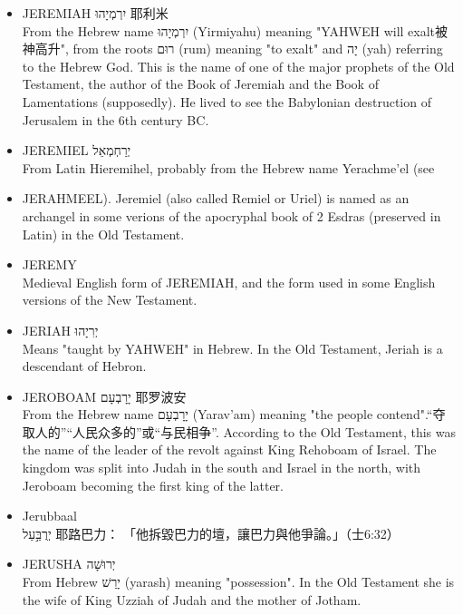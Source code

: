\begin{itemize}
From Hebrew יְרַחְמְאֵל (Yerachme'el) meaning "God will have pity". This name is borne by a few minor characters in the Old Testament.
\item JEREMIAH יִרְמְיָהוּ 耶利米\\
From the Hebrew name יִרְמְיָהוּ (Yirmiyahu) meaning "YAHWEH will exalt被神高升", from the roots רוּם (rum) meaning "to exalt" and יָה (yah) referring to the Hebrew God. This is the name of one of the major prophets of the Old Testament, the author of the Book of Jeremiah and the Book of Lamentations (supposedly). He lived to see the Babylonian destruction of Jerusalem in the 6th century BC.
\item JEREMIEL יְרַחְמְאֵל \\
From Latin Hieremihel, probably from the Hebrew name Yerachme'el (see \item JERAHMEEL). Jeremiel (also called Remiel or Uriel) is named as an archangel in some verions of the apocryphal book of 2 Esdras (preserved in Latin) in the Old Testament.
\item JEREMY \\
Medieval English form of JEREMIAH, and the form used in some English versions of the New Testament.
\item JERIAH יְרִיָהוּ \\
Means "taught by YAHWEH" in Hebrew. In the Old Testament, Jeriah is a descendant of Hebron.
\item JEROBOAM יָרָבְעָם 耶罗波安 \\
From the Hebrew name יָרָבְעָם (Yarav'am) meaning "the people contend".“夺取人的”“人民众多的”或“与民相争”. According to the Old Testament, this was the name of the leader of the revolt against King Rehoboam of Israel. The kingdom was split into Judah in the south and Israel in the north, with Jeroboam becoming the first king of the latter.
\item Jerubbaal יְרֻבַּ֣עַל 耶路巴力： 「他拆毀巴力的壇，讓巴力與他爭論。」（士6:32）
\item JERUSHA יְרוּשָׁה \\
From Hebrew יָרַשׁ (yarash) meaning "possession". In the Old Testament she is the wife of King Uzziah of Judah and the mother of Jotham.


\end{itemize}
